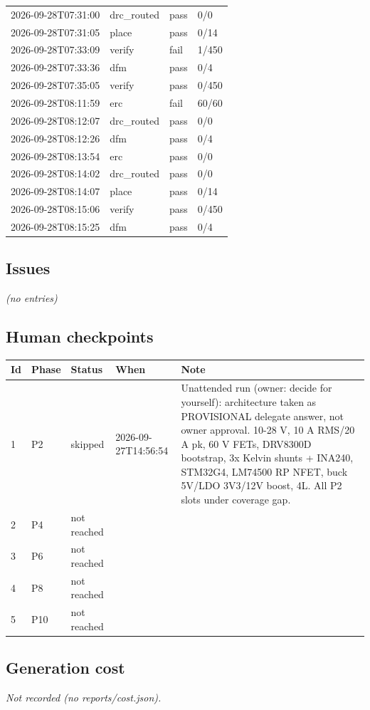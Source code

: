 \documentclass[11pt,a4paper]{article}
\begin{document}
{\begin{longtable}{llll}
2026-09-28T07:31:00 & drc\_routed & pass & 0/0 \\
2026-09-28T07:31:05 & place & pass & 0/14 \\
2026-09-28T07:33:09 & verify & fail & 1/450 \\
2026-09-28T07:33:36 & dfm & pass & 0/4 \\
2026-09-28T07:35:05 & verify & pass & 0/450 \\
2026-09-28T08:11:59 & erc & fail & 60/60 \\
2026-09-28T08:12:07 & drc\_routed & pass & 0/0 \\
2026-09-28T08:12:26 & dfm & pass & 0/4 \\
2026-09-28T08:13:54 & erc & pass & 0/0 \\
2026-09-28T08:14:02 & drc\_routed & pass & 0/0 \\
2026-09-28T08:14:07 & place & pass & 0/14 \\
2026-09-28T08:15:06 & verify & pass & 0/450 \\
2026-09-28T08:15:25 & dfm & pass & 0/4 \\
\bottomrule
\end{longtable}
}
\subsection*{Issues}
\emph{(no entries)}
\subsection*{Human checkpoints}
{\small
\begin{longtable}{lllp{2.6cm}p{6.4cm}}
\toprule
\textbf{Id} & \textbf{Phase} & \textbf{Status} & \textbf{When} & \textbf{Note} \\
\midrule
\endhead
1 & P2 & skipped & 2026-09-27T14:56:54 & Unattended run (owner: decide for yourself): architecture taken as PROVISIONAL delegate answer, not owner approval. 10-28 V, 10 A RMS/20 A pk, 60 V FETs, DRV8300D bootstrap, 3x Kelvin shunts + INA240, STM32G4, LM74500 RP NFET, buck 5V/LDO 3V3/12V boost, 4L. All P2 slots under coverage gap. \\
2 & P4 & not reached &  &  \\
3 & P6 & not reached &  &  \\
4 & P8 & not reached &  &  \\
5 & P10 & not reached &  &  \\
\bottomrule
\end{longtable}
}
\subsection*{Generation cost}
\emph{Not recorded (no reports/cost.json).}
\end{document}
